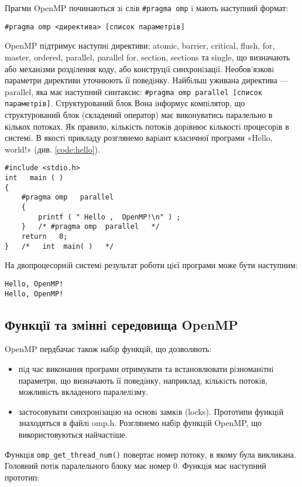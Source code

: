 Прагми OpenMP починаються зi слiв \verb'#pragma omp' i мають наступний формат:

\verb'#pragma omp <директива> [список параметрiв]'

OpenMP пiдтримує наступнi директиви: atomic, barrier, critical, flush, for, master, ordered, parallel, parallel for, section, sections та single, що визначають або механiзми роздiлення коду, або конструцiї синхронiзацiї. Необов’язковi параметри директиви уточнюють її поведiнку.
Найбiльш уживана директива — parallel, яка має наступний синтаксис:
\verb'#pragma omp parallel [список параметрiв]'. Структурований блок
Вона iнформує компiлятор, що структурований блок (складений оператор) має виконуватись паралельно в кiлькох потоках. Як правило, кiлькiсть потокiв дорiвнює кiлькостi процесорiв в системi. В якостi прикладу розглянемо варiант класичної програми «Hello, world!» (див. \ref{code:hello}).

\begin{lstlisting}[label=code:hello,caption=Програма Hello OpenMP!]
#include <stdio.h>
int   main ( )
{
	#pragma omp   parallel
	{
		printf ( " Hello ,  OpenMP!\n" ) ;
	}   /* #pragma omp  parallel   */
	return   0; 
}   /*   int  main( )   */
\end{lstlisting}

На двопроцесорнiй системi результат роботи цiєї програми може бути наступним:

\begin{verbatim}
Hello, OpenMP! 
Hello, OpenMP!
\end{verbatim}

\subsection*{Функцiї та змiннi середовища OpenMP}
OpenMP пердбачає також набiр функцiй, що дозволяють:

\begin{itemize}
\item пiд час виконання програми отримувати та встановлювати рiзноманiтнi параметри, що визначають її поведiнку, наприклад, кiлькiсть потокiв, можливiсть вкладеного паралелiзму.
\item застосовувати синхронiзацiю на основi замкiв (locks).
Прототипи функцiй знаходяться в файлi omp.h. Розглянемо набiр функцiй OpenMP, що використовуються найчастiше.
\end{itemize}

Функцiя \verb'omp_get_thread_num()' повертає номер потоку, в якому була викликана. Головний потiк паралельного блоку має номер 0. Функцiя має наступний прототип:

